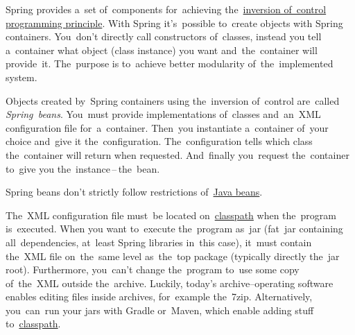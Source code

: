 \label{springinversionofcontrol}
Spring provides a~set of~components for~achieving the~\hyperref[inversionofcontrol]{inversion of~control programming principle}.
With Spring it's~possible to~create objects with Spring containers.
You~don't directly call constructors of~classes, instead you tell a~container what object (class instance) you want and~the~container will provide~it.
The~purpose is to~achieve better modularity of~the~implemented system.

Objects created by~Spring containers using the~inversion of~control are~called \textit{Spring~beans}.
You~must provide implementations of~classes and~an~XML configuration file for~a~container.
Then~you instantiate a~container of~your choice and~give it the~configuration.
The~configuration tells which class the~container will return when requested.
And~finally you~request the~container to~give you the~instance\,--\,the~bean.

\warning Spring beans don't strictly follow restrictions of~\hyperref[javabeans]{Java beans}.

\warning The~XML configuration file must~be located on~\hyperref[classpath]{classpath} when the~program is~executed.
When you want to~execute the~program as~jar (fat~jar containing all~dependencies, at~least Spring libraries in~this case), it~must contain the~XML file on~the~same level as~the~top package (typically directly the~jar root).
Furthermore, you~can't change the~program to~use some copy of~the~XML outside the~archive.
Luckily, today's archive--operating software enables editing files inside archives, for~example the~7zip.
Alternatively, you~can~run your jars with Gradle or~Maven, which enable adding stuff to~\hyperref[classpath]{classpath}.
\newpage

